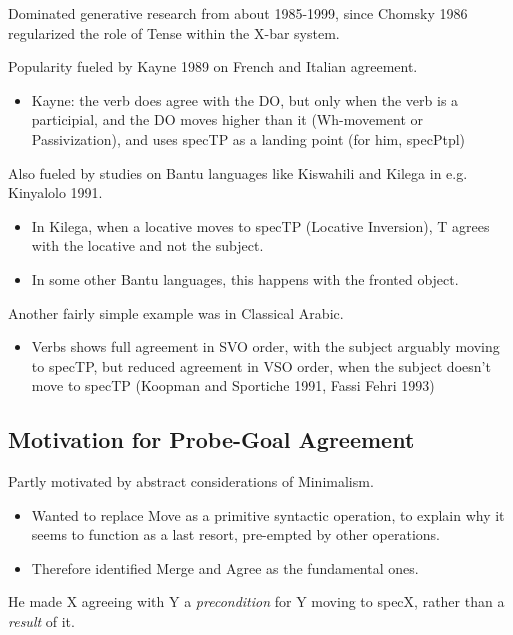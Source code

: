 Dominated generative research from about 1985-1999, since Chomsky 1986 regularized the role of Tense within the X-bar system.

Popularity fueled by Kayne 1989 on French and Italian agreement.

\begin{itemize}
  \item Kayne: the verb does agree with the DO, but only when the verb is a participial, and the DO moves higher than it (Wh-movement or Passivization), and uses specTP as a landing point (for him, specPtpl)
\end{itemize}

Also fueled by studies on Bantu languages like Kiswahili and Kilega in e.g. Kinyalolo 1991.

\begin{itemize}
  \item In Kilega, when a locative moves to specTP (Locative Inversion), T agrees with the locative and not the subject.
  \item In some other Bantu languages, this happens with the fronted object.
\end{itemize}

Another fairly simple example was in Classical Arabic.

\begin{itemize}
  \item Verbs shows full agreement in SVO order, with the subject arguably moving to specTP, but reduced agreement in VSO order, when the subject doesn't move to specTP (Koopman and Sportiche 1991, Fassi Fehri 1993)
\end{itemize}

\subsection*{Motivation for Probe-Goal Agreement}

Partly motivated by abstract considerations of Minimalism.

\begin{itemize}
  \item Wanted to replace Move as a primitive syntactic operation, to explain why it seems to function as a last resort, pre-empted by other operations.
  \item Therefore identified Merge and Agree as the fundamental ones.
\end{itemize}

He made X agreeing with Y a \textit{precondition} for Y moving to specX, rather than a \textit{result} of it.

